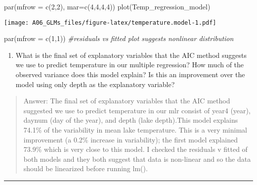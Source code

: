 \documentclass[
]{article}
\newenvironment{Shaded}{\begin{snugshade}}{\end{snugshade}}
\newcommand{\AttributeTok}[1]{\textcolor[rgb]{0.77,0.63,0.00}{#1}}
\newcommand{\CommentTok}[1]{\textcolor[rgb]{0.56,0.35,0.01}{\textit{#1}}}
\newcommand{\DecValTok}[1]{\textcolor[rgb]{0.00,0.00,0.81}{#1}}
\newcommand{\FunctionTok}[1]{\textcolor[rgb]{0.00,0.00,0.00}{#1}}
\newcommand{\NormalTok}[1]{#1}
\providecommand{\tightlist}{%
  \setlength{\itemsep}{0pt}\setlength{\parskip}{0pt}}
\begin{document}
\begin{Shaded}
\begin{Highlighting}[]
\FunctionTok{par}\NormalTok{(}\AttributeTok{mfrow =} \FunctionTok{c}\NormalTok{(}\DecValTok{2}\NormalTok{,}\DecValTok{2}\NormalTok{), }\AttributeTok{mar=}\FunctionTok{c}\NormalTok{(}\DecValTok{4}\NormalTok{,}\DecValTok{4}\NormalTok{,}\DecValTok{4}\NormalTok{,}\DecValTok{4}\NormalTok{))}
\FunctionTok{plot}\NormalTok{(Temp\_regression\_model)}
\end{Highlighting}
\end{Shaded}

\texttt{[image: A06\_GLMs\_files/figure-latex/temperature.model-1.pdf]}

\begin{Shaded}
\begin{Highlighting}[]
\FunctionTok{par}\NormalTok{(}\AttributeTok{mfrow =} \FunctionTok{c}\NormalTok{(}\DecValTok{1}\NormalTok{,}\DecValTok{1}\NormalTok{))}
\CommentTok{\#residuals vs fitted plot suggests nonlinear distribution }
\end{Highlighting}
\end{Shaded}

\begin{enumerate}
\def\labelenumi{\arabic{enumi}.}
\setcounter{enumi}{10}
\tightlist
\item
  What is the final set of explanatory variables that the AIC method
  suggests we use to predict temperature in our multiple regression? How
  much of the observed variance does this model explain? Is this an
  improvement over the model using only depth as the explanatory
  variable?
\end{enumerate}

\begin{quote}
Answer: The final set of explanatory variables that the AIC method
suggested we use to predict temperature in our mlr consist of year4
(year), daynum (day of the year), and depth (lake depth).This model
explains 74.1\% of the variability in mean lake temperature. This is a
very minimal improvement (a 0.2\% increase in variability); the first
model explained 73.9\% which is very close to this model. I checked the
residuals v fitted of both models and they both suggest that data is
non-linear and so the data should be linearized before running lm().
\end{quote}

\begin{center}\rule{0.5\linewidth}{0.5pt}\end{center}
\end{document}
